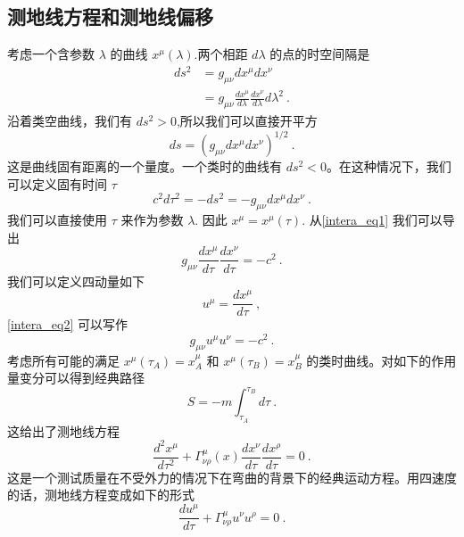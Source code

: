 \subsection{测地线方程和测地线偏移}
考虑一个含参数 $\lambda$ 的曲线 $x^\mu(\lambda)$.两个相距 $d\lambda$ 的点的时空间隔是
\begin{equation}
\begin{aligned}
ds^2 & = g_{\mu\nu}  dx^\mu dx^\nu \\
& = g_{\mu\nu } \frac{dx^\mu}{d\lambda} \frac{dx^\nu}{d\lambda} d \lambda^2~.
\end{aligned}
\end{equation}
沿着类空曲线，我们有 $ds^2>0$,所以我们可以直接开平方
\begin{equation}
ds = (g_{\mu\nu } dx^\mu dx^\nu )^{1/2}~. 
\end{equation}
这是曲线固有距离的一个量度。一个类时的曲线有 $ds^2<0$。在这种情况下，我们可以定义固有时间 $\tau$
\begin{equation}\label{intera_eq1}
c^2 d \tau^2  = - ds^2 = - g_{\mu\nu} dx^\mu dx^\nu ~. 
\end{equation}
我们可以直接使用 $\tau$ 来作为参数 $\lambda$. 因此 $x^\mu = x^\mu(\tau)$. 从\autoref{intera_eq1} 我们可以导出
\begin{equation}\label{intera_eq2}
g_{\mu\nu} \frac{dx^\mu}{d\tau} \frac{dx^\nu}{d\tau} = - c^2~. 
\end{equation}
我们可以定义四动量如下
\begin{equation}
u^\mu = \frac{d x^\mu}{d \tau} ~,
\end{equation}
\autoref{intera_eq2} 可以写作
\begin{equation}
g_{\mu\nu} u^\mu u^\nu = - c^2~.
\end{equation}
考虑所有可能的满足 $x^\mu(\tau_A)=x^\mu_{A}$ 和 $x^\mu(\tau_B) = x^\mu_{B}$ 的类时曲线。对如下的作用量变分可以得到经典路径
\begin{equation}
S = - m \int_{\tau_A}^{\tau_B} d \tau~. 
\end{equation}
这给出了测地线方程
\begin{equation}\label{intera_eq3}
\frac{d^2 x^\mu}{d \tau^2} + \Gamma^\mu_{\nu\rho} (x) \frac{dx^\nu}{d \tau} \frac{dx^\rho}{d\tau} = 0~. 
\end{equation}
这是一个测试质量在不受外力的情况下在弯曲的背景下的经典运动方程。用四速度的话，测地线方程变成如下的形式
\begin{equation}
\frac{du^\mu}{d\tau} + \Gamma^\mu_{\nu\rho} u^\nu u^\rho = 0~.
\end{equation}
